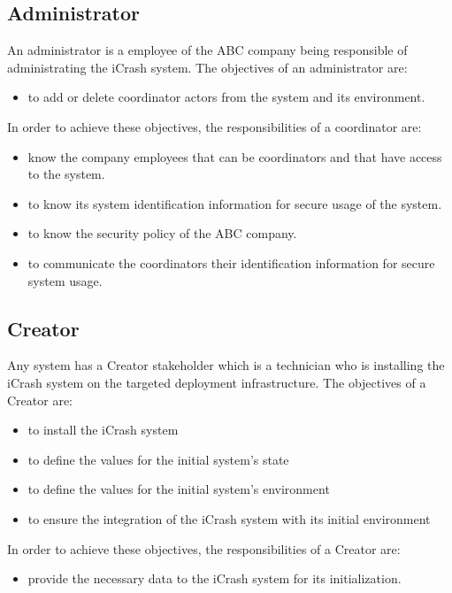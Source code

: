 \subsection{Administrator}
An administrator is a employee of the ABC company being responsible of
administrating the iCrash system. The objectives of an administrator are:
\begin{itemize}
\item    to add or delete coordinator actors from the system and its
 environment.
\end{itemize}
In order to achieve these objectives, the responsibilities of a coordinator are:
\begin{itemize}
\item    know the company employees that can be coordinators and that have
 access to the system.
\item    to know its system identification information for secure usage of the
 system.
\item    to know the security policy of the ABC company.
\item    to communicate the coordinators their identification information for
 secure system usage.
\end{itemize}

\subsection{Creator}
Any system has a Creator stakeholder which is a technician who is installing the
iCrash system on the targeted deployment infrastructure. The objectives of a
Creator are:
\begin{itemize}
	\item to install the iCrash system
	\item to define the values for the initial system's state
	\item to define the values for the initial system's environment
	\item to ensure the integration of the iCrash system with its initial
	environment
\end{itemize}
In order to achieve these objectives, the responsibilities of a Creator are:
\begin{itemize}
\item provide the necessary data to the iCrash system for its initialization.
\end{itemize}
